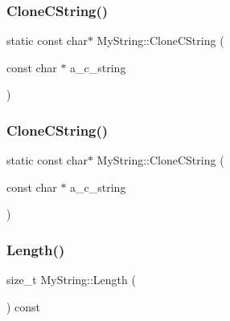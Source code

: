 \mbox{\label{class_my_string_a3acde3db40f8e70bad239739a5466275}} 
\subsubsection{\texorpdfstring{CloneCString()}{CloneCString()}\hspace{0.1cm}{\footnotesize\ttfamily [2/3]}}
{\footnotesize\ttfamily static const char$\ast$ My\+String\+::\+Clone\+C\+String (\begin{DoxyParamCaption}\item[{const char $\ast$}]{a\+\_\+c\+\_\+string }\end{DoxyParamCaption})\hspace{0.3cm}{\ttfamily [static]}}

\mbox{\label{class_my_string_a3acde3db40f8e70bad239739a5466275}} 
\subsubsection{\texorpdfstring{CloneCString()}{CloneCString()}\hspace{0.1cm}{\footnotesize\ttfamily [3/3]}}
{\footnotesize\ttfamily static const char$\ast$ My\+String\+::\+Clone\+C\+String (\begin{DoxyParamCaption}\item[{const char $\ast$}]{a\+\_\+c\+\_\+string }\end{DoxyParamCaption})\hspace{0.3cm}{\ttfamily [static]}}

\mbox{\label{class_my_string_a4eb168b1ec401a732b3859abe004d648}} 
\subsubsection{\texorpdfstring{Length()}{Length()}\hspace{0.1cm}{\footnotesize\ttfamily [1/3]}}
{\footnotesize\ttfamily size\+\_\+t My\+String\+::\+Length (\begin{DoxyParamCaption}{ }\end{DoxyParamCaption}) const\hspace{0.3cm}{\ttfamily [inline]}}

